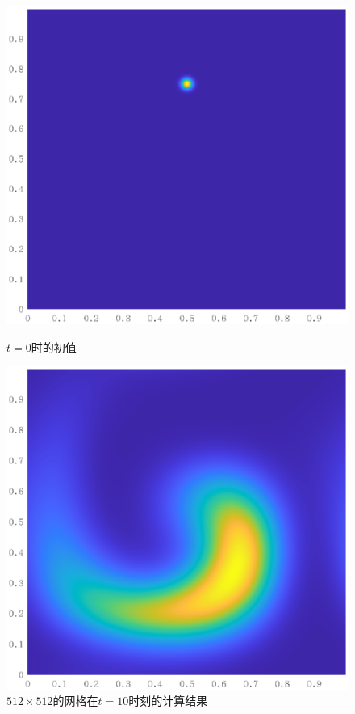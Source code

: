 \documentclass[lang=cn,10pt,bibend=bibtex]{elegantbook}
\begin{document}
\begin{figure}[H]
  \centering
  \begin{minipage}[t]{0.49\linewidth}
      \centering
      \includegraphics[width=0.9\linewidth]{figure/test2_init.eps}
      \caption*{$t=0$时的初值}
  \end{minipage}
  \begin{minipage}[t]{0.49\linewidth}
    \centering
    \includegraphics[width=0.9\linewidth]{figure/test2_end.eps}
    \caption*{$512\times 512$的网格在$t=10$时刻的计算结果}
  \end{minipage}
\end{figure}
\end{document}
